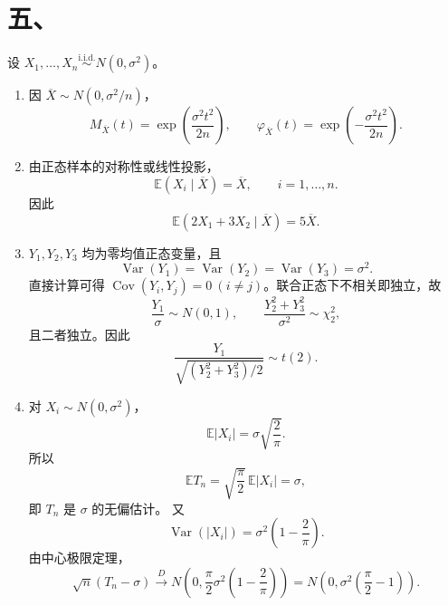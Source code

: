 \documentclass[UTF8,zihao=-4,fontset=windows]{ctexart}
\newcommand{\EX}{\mathbb E}
\newcommand{\Var}{\operatorname{Var}}
\newcommand{\Cov}{\operatorname{Cov}}
\newcommand{\iid}{\overset{\mathrm{i.i.d.}}{\sim}}
\begin{document}
\section*{五、}
设 $X_1,\ldots,X_n \iid N(0,\sigma^2)$。
\begin{enumerate}
  \item 因 $\overline X\sim N(0,\sigma^2/n)$，
  \[
    M_{\overline X}(t)=\exp\left(\frac{\sigma^2t^2}{2n}\right),
    \qquad
    \varphi_{\overline X}(t)=\exp\left(-\frac{\sigma^2t^2}{2n}\right).
  \]

  \item 由正态样本的对称性或线性投影，
  \[
    \EX(X_i\mid \overline X)=\overline X,\qquad i=1,\ldots,n.
  \]
  因此
  \[
    \EX(2X_1+3X_2\mid \overline X)=5\overline X.
  \]

  \item $Y_1,Y_2,Y_3$ 均为零均值正态变量，且
  \[
    \Var(Y_1)=\Var(Y_2)=\Var(Y_3)=\sigma^2.
  \]
  直接计算可得 $\Cov(Y_i,Y_j)=0\ (i\ne j)$。联合正态下不相关即独立，故
  \[
    \frac{Y_1}{\sigma}\sim N(0,1),\qquad
    \frac{Y_2^2+Y_3^2}{\sigma^2}\sim \chi^2_2,
  \]
  且二者独立。因此
  \[
    \frac{Y_1}{\sqrt{(Y_2^2+Y_3^2)/2}}\sim t(2).
  \]

  \item 对 $X_i\sim N(0,\sigma^2)$，
  \[
    \EX|X_i|=\sigma\sqrt{\frac2\pi}.
  \]
  所以
  \[
    \EX T_n=\sqrt{\frac\pi2}\,\EX|X_i|=\sigma,
  \]
  即 $T_n$ 是 $\sigma$ 的无偏估计。
  又
  \[
    \Var(|X_i|)=\sigma^2\left(1-\frac2\pi\right).
  \]
  由中心极限定理，
  \[
    \sqrt n(T_n-\sigma)\xrightarrow{D}
    N\left(0,\frac\pi2\sigma^2\left(1-\frac2\pi\right)\right)
    =N\left(0,\sigma^2\left(\frac\pi2-1\right)\right).
  \]
\end{enumerate}
\end{document}
